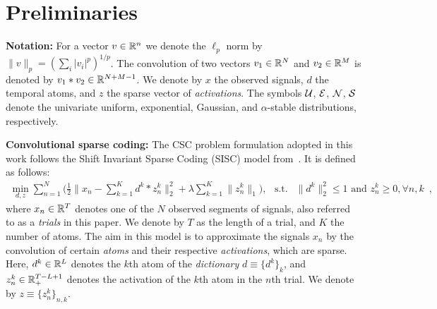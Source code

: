 




\section{Preliminaries}


\textbf{Notation:} For a vector $v \in \mathbb{R}^n$ we denote the $\ell_p$ norm by $\|v\|_p = \left(\sum_i |v_i|^p \right)^{1/p}$. The convolution of two vectors $v_1 \in \mathbb{R}^N$ and $v_2 \in \mathbb{R}^M$ is denoted by $v_1 \ast v_2 \in \mathbb{R}^{N + M - 1}$. We denote by $x$ the observed signals, $d$ the temporal atoms, and $z$ the sparse vector of \emph{activations}. The symbols ${\cal U}$, ${\cal E}$, ${\cal N}$, ${\cal S}$ denote the univariate uniform, exponential, Gaussian, and $\alpha$-stable distributions, respectively.

\textbf{Convolutional sparse coding:} 
The CSC problem formulation adopted in this work follows the Shift Invariant Sparse Coding (SISC) model from~\cite{Grosse-etal:2007}. It is defined as follows:
%
\begin{align}
 \min_{d, z} \sum_{n=1}^{N} \Big( \frac{1}{2}\|x_{n} - \sum_{k=1}^{K}d^{k} * z_{n}^{k}\|_{2}^{2} + \lambda \sum_{k=1}^K \|z_{n}^{k}\|_1 \Big), \hspace{9pt}
 \text{s.t. } \>\> \|d^{k}\|_2^2 \leq 1 \text{  and } z_n^k \geq 0, \forall n, k
\label{eq:problem_definition} \enspace ,
\end{align}
%
where $x_{n} \in \mathbb{R}^{T}$ denotes one of the $N$ observed segments of signals, also referred to as a \emph{trials} in this paper. We denote by $T$ as the length of a trial, and $K$ the number of atoms. The aim in this model is to approximate the signals $x_n$ by the convolution of certain \emph{atoms} and their respective \emph{activations}, which are sparse. Here, $d^{k} \in \mathbb{R}^{L}$ denotes the $k$th atom of the \emph{dictionary} $d \equiv \{d^k\}_{k}$, and $z_{n}^{k} \in \mathbb{R}_+^{T-L+1}$ denotes the activation of the $k$th atom in the $n$th trial. We denote by $z \equiv \{z_n^k\}_{n,k}$.

